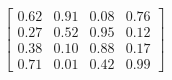 \documentclass[preview]{standalone}
\begin{document}
\begin{align*}
\begin{bmatrix}0.62 & 0.91 & 0.08 & 0.76 \\ 0.27 & 0.52 & 0.95 & 0.12 \\ 0.38 & 0.10 & 0.88 & 0.17 \\ 0.71 & 0.01 & 0.42 & 0.99 \end{bmatrix}
\end{align*}
\end{document}
